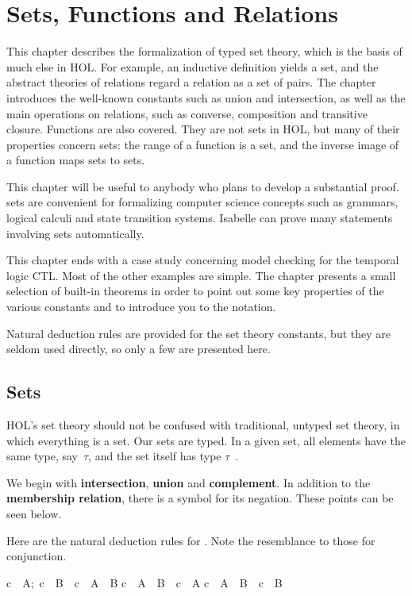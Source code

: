 \chapter{Sets, Functions and Relations}

This chapter describes the formalization of typed set theory, which is
the basis of much else in HOL\@.  For example, an
inductive definition yields a set, and the abstract theories of relations
regard a relation as a set of pairs.  The chapter introduces the well-known
constants such as union and intersection, as well as the main operations on relations, such as converse, composition and
transitive closure.  Functions are also covered.  They are not sets in
HOL, but many of their properties concern sets: the range of a
function is a set, and the inverse image of a function maps sets to sets.

This chapter will be useful to anybody who plans to develop a substantial
proof.  sets are convenient for formalizing  computer science concepts such
as grammars, logical calculi and state transition systems.  Isabelle can
prove many statements involving sets automatically.

This chapter ends with a case study concerning model checking for the
temporal logic CTL\@.  Most of the other examples are simple.  The
chapter presents a small selection of built-in theorems in order to point
out some key properties of the various constants and to introduce you to
the notation. 

Natural deduction rules are provided for the set theory constants, but they
are seldom used directly, so only a few are presented here.  


\section{Sets}

%
HOL's set theory should not be confused with traditional,  untyped set
theory, in which everything is a set.  Our sets are typed. In a given set,
all elements have the same type, say~$\tau$,  and the set itself has type
$\tau$~. 

We begin with \textbf{intersection}, \textbf{union} and
\textbf{complement}. In addition to the
\textbf{membership relation}, there  is a symbol for its negation. These
points can be seen below.  

Here are the natural deduction rules for .  Note
the  resemblance to those for conjunction.  
\begin{isabelle}
\isasymlbrakk c\ \isasymin\ A;\ c\ \isasymin\ B\isasymrbrakk\ 
\isasymLongrightarrow\ c\ \isasymin\ A\ \isasyminter\ B%
\isanewline
c\ \isasymin\ A\ \isasyminter\ B\ \isasymLongrightarrow\ c\ \isasymin\ A
\rulename{IntD1}\isanewline
c\ \isasymin\ A\ \isasyminter\ B\ \isasymLongrightarrow\ c\ \isasymin\ B
\rulename{IntD2}
\end{isabelle}

